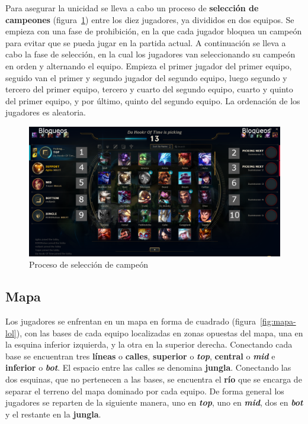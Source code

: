 Para asegurar la unicidad se lleva a cabo un proceso de \textbf{selección de campeones} (figura~\ref{fig:early-pick}) entre los diez jugadores, ya divididos en dos equipos. Se empieza con una fase de prohibición, en la que cada jugador bloquea un campeón para evitar que se pueda jugar en la partida actual. A continuación se lleva a cabo la fase de selección, en la cual los jugadores van seleccionando su campeón en orden y alternando el equipo. Empieza el primer jugador del primer equipo, seguido van el primer y segundo jugador del segundo equipo, luego segundo y tercero del primer equipo, tercero y cuarto del segundo equipo, cuarto y quinto del primer equipo, y por último, quinto del segundo equipo. La ordenación de los jugadores es aleatoria.

\begin{figure}[h]
	\centering
	\includegraphics[width=1\linewidth]{img/early-pick}
	\caption{Proceso de selección de campeón}
	\label{fig:early-pick}
\end{figure}

\subsection{Mapa}
Los jugadores se enfrentan en un mapa en forma de cuadrado (figura~\ref{fig:mapa-lol}), con las bases de cada equipo localizadas en zonas opuestas del mapa, una en la esquina inferior izquierda, y la otra en la superior derecha. Conectando cada base se encuentran tres \textbf{líneas} o \textbf{calles}, \textbf{superior} o \textit{\textbf{top}}, \textbf{central} o \textit{\textbf{mid}} e \textbf{inferior} o \textit{\textbf{bot}}. El espacio entre las calles se denomina \textbf{jungla}. Conectando las dos esquinas, que no pertenecen a las bases, se encuentra el \textbf{río} que se encarga de separar el terreno del mapa dominado por cada equipo. De forma general los jugadores se reparten de la siguiente manera, uno en \textit{\textbf{top}}, uno en \textit{\textbf{mid}}, dos en \textit{\textbf{bot}} y el restante en la \textbf{jungla}.

